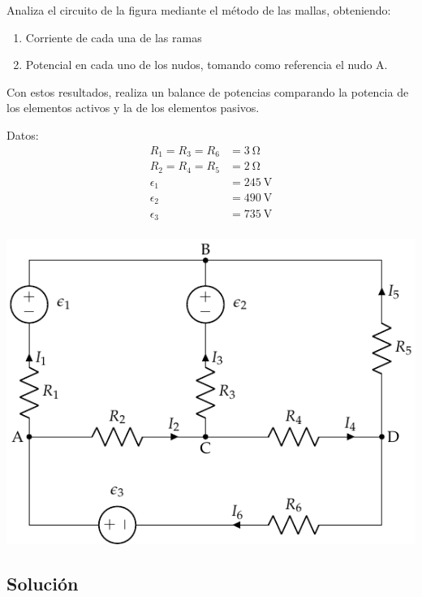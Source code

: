 \documentclass[10pt]{article}
\begin{document}
Analiza el circuito de la figura mediante el método de las mallas, obteniendo:
\begin{enumerate}
\item Corriente de cada una de las ramas
\item Potencial en cada uno de los nudos, tomando como referencia el
  nudo A.
\end{enumerate}

Con estos resultados, realiza un balance de potencias comparando la potencia de los elementos activos y la de los elementos pasivos.

\begin{minipage}{0.4\linewidth}
  Datos:
  \begin{align*}
    R_1 = R_3 = R_6 &= \SI{3}{\ohm}\\
    R_2 = R_4 = R_5 &= \SI{2}{\ohm}\\
    \epsilon_1 &= \SI{245}{\volt}\\
    \epsilon_2 &= \SI{490}{\volt}\\
    \epsilon_3 &= \SI{735}{\volt}\\
  \end{align*}
\end{minipage}
\begin{minipage}{0.6\linewidth}
  \includegraphics{../figs/mallas1.pdf}
\end{minipage}

\subsection*{Solución}
\end{document}
